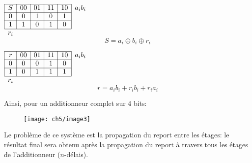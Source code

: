 \begin{minipage}[t]{.3\textwidth}
	\begin{table}[H]
		\centering
		$\begin{array}{|c|c|c|c|c|c}
			\cline{1-5}
			S & 00 & 01 & 11 & 10 & a_ib_i\\
			\cline{1-5}
			0 & 0 & 1 & 0 & 1 & \\
			\cline{1-5}
			1 & 1 & 0 & 1 & 0 & \\
			\cline{1-5}
			\multicolumn{1}{c}{r_i} & \multicolumn{1}{c}{ } & \multicolumn{1}{c}{ } & \multicolumn{1}{c}{ } & \multicolumn{1}{c}{ } & \multicolumn{1}{c}{ } 	
		\end{array}$
		\begin{equation*}
			S = a_i\oplus b_i\oplus r_i
			\end{equation*} 
	\end{table}
\end{minipage}
\begin{minipage}[t]{.3\textwidth}
	\begin{table}[H]
		\centering
		$\begin{array}{|c|c|c|c|c|c}
			\cline{1-5}
			r & 00 & 01 & 11 & 10 & a_ib_i\\
			\cline{1-5}
			0 & 0 & 0 & 1 & 0 & \\
			\cline{1-5}
			1 & 0 & 1 & 1 & 1 & \\
			\cline{1-5}
			\multicolumn{1}{c}{r_i} & \multicolumn{1}{c}{ } & \multicolumn{1}{c}{ } & \multicolumn{1}{c}{ } & \multicolumn{1}{c}{ } & \multicolumn{1}{c}{ } 	
		\end{array}$
		\begin{equation*}
			r = a_ib_i+r_ib_i+r_ia_i
		\end{equation*} 
	\end{table}
\end{minipage}
Ainsi, pour un additionneur complet sur 4 bits:
\begin{figure}[H]
	\centering
	\texttt{[image: ch5/image3]}
\end{figure}
Le problème de ce système est la propagation du report entre les étages: le résultat final sera obtenu après la propagation du report à travers tous les étages de l’additionneur ($n$-délais).

